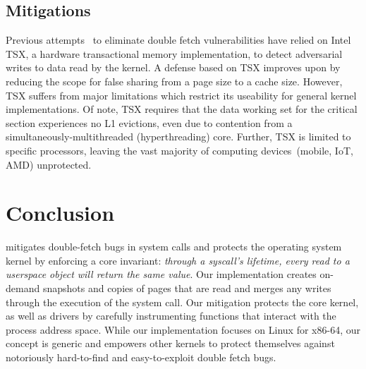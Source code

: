 \documentclass[letterpaper,twocolumn,10pt]{article}
\begin{document}

\subsection{Mitigations}

Previous attempts~\cite{schwartzDECAF,dftinker} to eliminate double fetch 
vulnerabilities have relied on Intel TSX, a hardware transactional 
memory implementation, to detect adversarial writes to data read by the 
kernel. 
A defense based on TSX improves upon \midas by reducing the scope for 
false sharing from a page size to a cache size. 
However, TSX suffers from major limitations which restrict its useability
for general kernel implementations. 
Of note, TSX requires that the data working set for the critical section 
experiences no L1 evictions, even due to contention from a 
simultaneously-multithreaded (hyperthreading) core.
Further, TSX is limited to specific processors, leaving the vast majority
of computing devices~(mobile, IoT, AMD) unprotected.

\section{Conclusion}

\midas mitigates double-fetch bugs in system calls and protects the operating
system kernel by enforcing a core invariant:  \emph{through a syscall's
lifetime, every read to a userspace object will return the same value}.
Our \midas implementation creates on-demand snapshots and copies of pages that
are read and merges any writes through the execution of the system call.
%
Our mitigation protects the core kernel, as well as drivers by carefully
instrumenting functions that interact with the process address space. While our
implementation focuses on Linux for x86-64, our concept is generic and empowers
other kernels to protect themselves against notoriously hard-to-find and
easy-to-exploit double fetch bugs.
\end{document}
